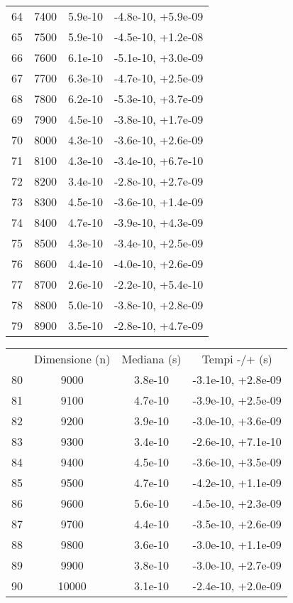 \begin{table}
\begin{adjustbox}{width=1\textwidth/2}
\begin{tabular}{|c|c|c|c|}
\cline{1-4}
64 & 7400 & 5.9e-10 & -4.8e-10, +5.9e-09 \\
\cline{1-4}
65 & 7500 & 5.9e-10 & -4.5e-10, +1.2e-08 \\
\cline{1-4}
66 & 7600 & 6.1e-10 & -5.1e-10, +3.0e-09 \\
\cline{1-4}
67 & 7700 & 6.3e-10 & -4.7e-10, +2.5e-09 \\
\cline{1-4}
68 & 7800 & 6.2e-10 & -5.3e-10, +3.7e-09 \\
\cline{1-4}
69 & 7900 & 4.5e-10 & -3.8e-10, +1.7e-09 \\
\cline{1-4}
70 & 8000 & 4.3e-10 & -3.6e-10, +2.6e-09 \\
\cline{1-4}
71 & 8100 & 4.3e-10 & -3.4e-10, +6.7e-10 \\
\cline{1-4}
72 & 8200 & 3.4e-10 & -2.8e-10, +2.7e-09 \\
\cline{1-4}
73 & 8300 & 4.5e-10 & -3.6e-10, +1.4e-09 \\
\cline{1-4}
74 & 8400 & 4.7e-10 & -3.9e-10, +4.3e-09 \\
\cline{1-4}
75 & 8500 & 4.3e-10 & -3.4e-10, +2.5e-09 \\
\cline{1-4}
76 & 8600 & 4.4e-10 & -4.0e-10, +2.6e-09 \\
\cline{1-4}
77 & 8700 & 2.6e-10 & -2.2e-10, +5.4e-10 \\
\cline{1-4}
78 & 8800 & 5.0e-10 & -3.8e-10, +2.8e-09 \\
\cline{1-4}
79 & 8900 & 3.5e-10 & -2.8e-10, +4.7e-09 \\
\cline{1-4}
\end{tabular}
\end{adjustbox}
\end{table}

\begin{table}
\centering
\begin{adjustbox}{width=1\textwidth/2}
\begin{tabular}{|c|c|c|c|}
\hline
 & Dimensione (n) & Mediana (s) & Tempi -/+ (s) \\
80 & 9000 & 3.8e-10 & -3.1e-10, +2.8e-09 \\
\cline{1-4}
81 & 9100 & 4.7e-10 & -3.9e-10, +2.5e-09 \\
\cline{1-4}
82 & 9200 & 3.9e-10 & -3.0e-10, +3.6e-09 \\
\cline{1-4}
83 & 9300 & 3.4e-10 & -2.6e-10, +7.1e-10 \\
\cline{1-4}
84 & 9400 & 4.5e-10 & -3.6e-10, +3.5e-09 \\
\cline{1-4}
85 & 9500 & 4.7e-10 & -4.2e-10, +1.1e-09 \\
\cline{1-4}
86 & 9600 & 5.6e-10 & -4.5e-10, +2.3e-09 \\
\cline{1-4}
87 & 9700 & 4.4e-10 & -3.5e-10, +2.6e-09 \\
\cline{1-4}
88 & 9800 & 3.6e-10 & -3.0e-10, +1.1e-09 \\
\cline{1-4}
89 & 9900 & 3.8e-10 & -3.0e-10, +2.7e-09 \\
\cline{1-4}
90 & 10000 & 3.1e-10 & -2.4e-10, +2.0e-09 \\
\cline{1-4}
\end{tabular}
\end{adjustbox}
\end{table}
